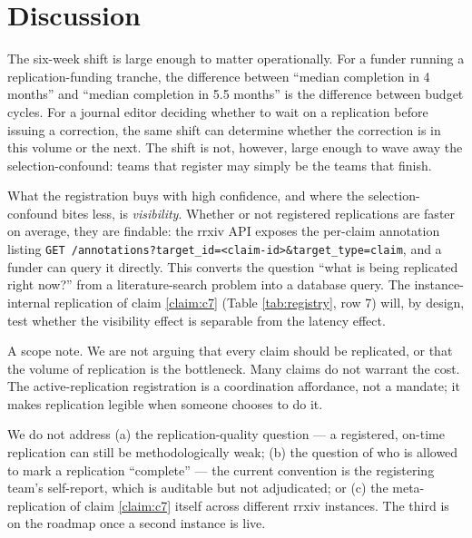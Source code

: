 \documentclass{rrxiv}
\begin{document}

\section{Discussion}
\label{sec:discussion}
The six-week shift is large enough to matter operationally. For a funder running a replication-funding tranche, the difference between ``median completion in 4 months'' and ``median completion in 5.5 months'' is the difference between budget cycles. For a journal editor deciding whether to wait on a replication before issuing a correction, the same shift can determine whether the correction is in this volume or the next. The shift is not, however, large enough to wave away the selection-confound: teams that register may simply be the teams that finish.

What the registration buys with high confidence, and where the selection-confound bites less, is \emph{visibility}. Whether or not registered replications are faster on average, they are findable: the rrxiv API exposes the per-claim annotation listing \texttt{GET /annotations?target\_id=<claim-id>\&target\_type=claim}, and a funder can query it directly. This converts the question ``what is being replicated right now?'' from a literature-search problem into a database query. The instance-internal replication of claim \ref{claim:c7} (Table \ref{tab:registry}, row 7) will, by design, test whether the visibility effect is separable from the latency effect.

A scope note. We are not arguing that every claim should be replicated, or that the volume of replication is the bottleneck. Many claims do not warrant the cost. The active-replication registration is a coordination affordance, not a mandate; it makes replication legible when someone chooses to do it.

\begin{scope}
We do not address (a) the replication-quality question --- a registered, on-time replication can still be methodologically weak; (b) the question of who is allowed to mark a replication ``complete'' --- the current convention is the registering team's self-report, which is auditable but not adjudicated; or (c) the meta-replication of claim \ref{claim:c7} itself across different rrxiv instances. The third is on the roadmap once a second instance is live.
\end{scope}
\end{document}
